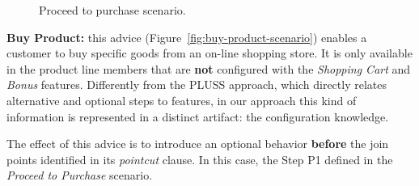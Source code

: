 \begin{figure}[h]
\caption{Proceed to purchase scenario.}
\label{fig:proceed-to-checkout}
\end{figure}

{\bf Buy Product:} this advice (Figure~\ref{fig:buy-product-scenario}) enables a
customer to buy specific goods from an on-line shopping store. It is only
available in the product line members that are {\bf not} configured with the
\emph{Shopping Cart} and \emph{Bonus} features. Differently from the PLUSS
approach, which directly relates alternative and optional steps to features, in
our approach this kind of information is represented in a distinct artifact: the
configuration knowledge.

The effect of this advice is to introduce an optional behavior {\bf
before} the join points identified in its \emph{pointcut} clause. In this case,
the Step P1 defined in the \emph{Proceed to Purchase} scenario.

